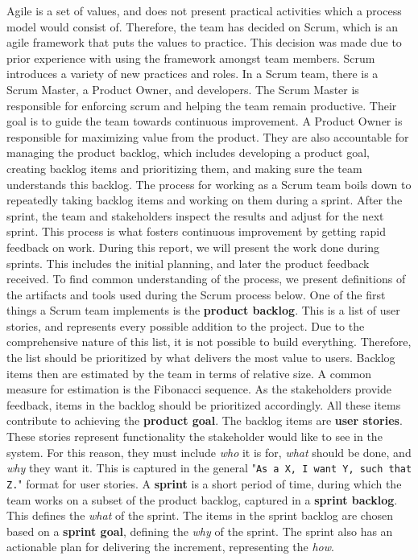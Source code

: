 Agile is a set of values, and does not present practical activities which a process model would consist of. Therefore, the team has decided on Scrum, which is an agile framework that puts the values to practice. This decision was made due to prior experience with using the framework amongst team members.
Scrum introduces a variety of new practices and roles. In a Scrum team, there is a Scrum Master, a Product Owner, and developers. The Scrum Master is responsible for enforcing scrum and helping the team remain productive. Their goal is to guide the team towards continuous improvement. A Product Owner is responsible for maximizing value from the product. They are also accountable for managing the product backlog, which includes developing a product goal, creating backlog items and prioritizing them, and making sure the team understands this backlog.
The process for working as a Scrum team boils down to repeatedly taking backlog items and working on them during a sprint. After the sprint, the team and stakeholders inspect the results and adjust for the next sprint. This process is what fosters continuous improvement by getting rapid feedback on work.
During this report, we will present the work done during sprints. This includes the initial planning, and later the product feedback received.
To find common understanding of the process, we present definitions of the artifacts and tools used during the Scrum process below.
One of the first things a Scrum team implements is the \textbf{product backlog}. This is a list of user stories, and represents every possible addition to the project. Due to the comprehensive nature of this list, it is not possible to build everything. Therefore, the list should be prioritized by what delivers the most value to users.
Backlog items then are estimated by the team in terms of relative size. A common measure for estimation is the Fibonacci sequence.
As the stakeholders provide feedback, items in the backlog should be prioritized accordingly. All these items contribute to achieving the \textbf{product goal}.
The backlog items are \textbf{user stories}. These stories represent functionality the stakeholder would like to see in the system. For this reason, they must include \textit{who} it is for, \textit{what} should be done, and \textit{why} they want it. This is captured in the general "\texttt{As a X, I want Y, such that Z.}" format for user stories.
A \textbf{sprint} is a short period of time, during which the team works on a subset of the product backlog, captured in a \textbf{sprint backlog}. This defines the \textit{what} of the sprint. The items in the sprint backlog are chosen based on a \textbf{sprint goal}, defining the \textit{why} of the sprint. The sprint also has an actionable plan for delivering the increment, representing the \textit{how}.
